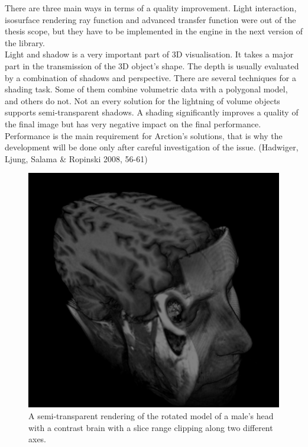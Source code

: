 \documentclass[twoside, english, 11pt]{report}
\begin{document}
There are three main ways in terms of a quality improvement. Light interaction, isosurface rendering ray function and advanced transfer function were out of the thesis scope, but they have to be implemented in the engine in the next version of the library.\\

Light and shadow is a very important part of 3D visualisation. It takes a major part in the transmission of the 3D object's shape. The depth is usually evaluated by a combination of shadows and perspective. There are several techniques for a shading task. Some of them combine volumetric data with a polygonal model, and others do not. Not an every solution for the lightning of volume objects supports semi-transparent shadows. A shading significantly improves a quality of the final image but has very negative impact on the final performance. Performance is the main requirement for Arction's solutions, that is why the development will be done only after careful investigation of the issue. (Hadwiger, Ljung, Salama \& Ropinski 2008, 56-61)\\

\begin{figure}[H]
\centerline{\includegraphics[scale = 0.7]{img/cuttedhead}}
\caption{A semi-transparent rendering of the rotated model of a male's head with a contrast brain with a slice range clipping along two different axes.\label{fig:cuttedhead}}
\end{figure}
\end{document}
